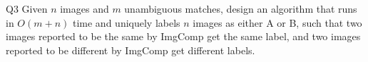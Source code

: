 \begin{problem}
  {Q3}
  Given $n$ images and $m$ unambiguous matches, design an algorithm that runs in $O(m+n)$ time and
  uniquely labels $n$ images as either A or B, such that two images reported to be the same by
  ImgComp get the same label, and two images reported to be different by ImgComp get different labels. \\
\end{problem}
